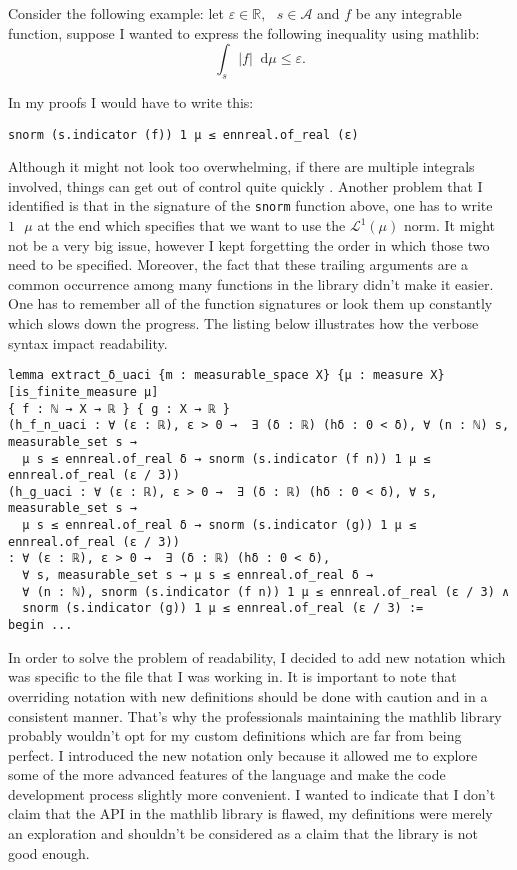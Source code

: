 \documentclass[11pt]{article}
\newenvironment{code}{\captionsetup{type=listing}}{}
\newcommand\R{\mathbb{R}}
\newcommand\Lmu{\mathcal{L}^1(\mu)}
\newcommand\A{\mathcal{A}}
\newcommand\sep{\text{ }}
\newcommand*\diff{\mathop{}\!\mathrm{d}}
\begin{document}
Consider the following example: let $\varepsilon \in \R, \sep s \in \A$ and $f$ be
any integrable function, suppose I wanted to express the following inequality
using mathlib:
\[
\int_s |f|\diff\mu \le \varepsilon
.\]

In my proofs I would have to write this:
\begin{code}
\begin{verbatim}
snorm (s.indicator (f)) 1 μ ≤ ennreal.of_real (ε)
\end{verbatim}
\end{code}

Although it might not look too overwhelming, if there are multiple integrals
involved, things can get out of control quite quickly . Another problem
that I identified is that in the signature of the \texttt{snorm} function
above, one has to write $1 \sep \mu $ at the end which specifies that we want
to use the $\Lmu $ norm. It might not be a very big issue, however I kept
forgetting the order in which those two need to be specified. Moreover, the
fact that these trailing arguments are a common occurrence among many functions
in the library didn't make it easier. One has to remember all of the function
signatures or look them up constantly which slows down the progress. The
listing below illustrates how the verbose syntax impact readability.
\begin{code}
\begin{verbatim}
lemma extract_δ_uaci {m : measurable_space X} {μ : measure X} [is_finite_measure μ]
{ f : ℕ → X → ℝ } { g : X → ℝ }
(h_f_n_uaci : ∀ (ε : ℝ), ε > 0 →  ∃ (δ : ℝ) (hδ : 0 < δ), ∀ (n : ℕ) s, measurable_set s →
  μ s ≤ ennreal.of_real δ → snorm (s.indicator (f n)) 1 μ ≤ ennreal.of_real (ε / 3))
(h_g_uaci : ∀ (ε : ℝ), ε > 0 →  ∃ (δ : ℝ) (hδ : 0 < δ), ∀ s, measurable_set s →
  μ s ≤ ennreal.of_real δ → snorm (s.indicator (g)) 1 μ ≤ ennreal.of_real (ε / 3))
: ∀ (ε : ℝ), ε > 0 →  ∃ (δ : ℝ) (hδ : 0 < δ),
  ∀ s, measurable_set s → μ s ≤ ennreal.of_real δ →
  ∀ (n : ℕ), snorm (s.indicator (f n)) 1 μ ≤ ennreal.of_real (ε / 3) ∧
  snorm (s.indicator (g)) 1 μ ≤ ennreal.of_real (ε / 3) :=
begin ...
\end{verbatim}
\end{code}

In order to solve the problem of readability, I decided to add new notation which
was specific to the file that I was working in. It is important to note that
overriding notation with new definitions should be done with caution and in a
consistent manner. That's why the professionals maintaining the mathlib library probably
wouldn't opt for my custom definitions which are far from being perfect. I introduced
the new notation only because it allowed me to explore some of the more advanced
features of the language and make the code development process slightly more
convenient. I wanted to indicate that I don't claim that the API in the mathlib
library is flawed, my definitions were merely an exploration and shouldn't be
considered as a claim that the library is not good enough.
\end{document}
